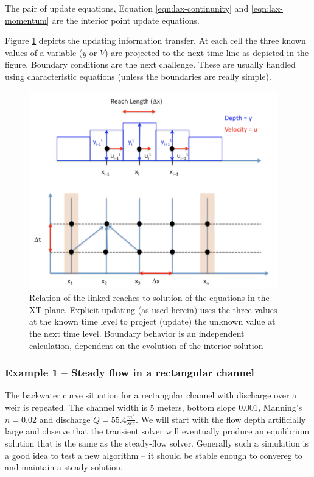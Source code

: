 The pair of update equations, Equation \ref{eqn:lax-continunity} and \ref{eqn:lax-momentum} are the interior point update equations.

Figure \ref{fig:space-time-map} depicts the updating information transfer. 
At each cell the three known values of a variable ($y$ or $V$) are projected to the next time line as depicted in the figure.
Boundary conditions are the next challenge.
These are usually handled using characteristic equations (unless the boundaries are really simple).

\begin{figure}[h!] %
   \centering
   \includegraphics[width=4.25in]{space-time-map.jpg} 
   \caption{Relation of the linked reaches to solution of the equations in the XT-plane. Explicit updating (as used herein) uses the three values at the known time level to project (update) the unknown value at the next time level. 
Boundary behavior is an independent calculation, dependent on the evolution of the interior solution}
   \label{fig:space-time-map}
\end{figure}

\subsubsection{Example 1 -- Steady flow in a rectangular channel}
The backwater curve situation for a rectangular channel with discharge over a weir is repeated.  
The channel width is 5 meters, bottom slope $0.001$, Manning's $n=0.02$ and discharge $Q=55.4 \frac{m^3}{sec}$.
We will start with the flow depth artificially large and observe that the transient solver will eventually produce an equilibrium solution that is the same as the steady-flow solver.  
Generally such a simulation is a good idea to test a new algorithm -- it should be stable enough to convereg to and maintain a steady solution.

